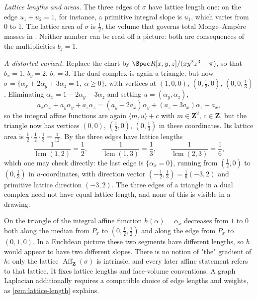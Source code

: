 \begin{example}
\emph{Lattice lengths and areas.} The three edges of $\sigma$ have
lattice length one: on the edge $u_1+u_2=1$, for instance, a primitive
integral slope is $u_1$, which varies from $0$ to $1$. The lattice
area of $\sigma$ is $\tfrac12$, the volume that governs total
Monge--Amp\`ere masses in . Neither number can
be read off a picture: both are consequences of the multiplicities
$b_j=1$.

\emph{A distorted variant.} Replace the chart by
$\Spec R[x,y,z]/(xy^2z^3-\pi)$, so that $b_x=1$, $b_y=2$,
$b_z=3$. The dual complex is again a triangle, but now
$\sigma=\{\alpha_x+2\alpha_y+3\alpha_z=1,\ \alpha\ge0\}$, with vertices at
$(1,0,0)$, $(0,\tfrac12,0)$, $(0,0,\tfrac13)$. Eliminating
$\alpha_x=1-2\alpha_y-3\alpha_z$ and setting $u=(\alpha_y,\alpha_z)$,
\[
 a_x\alpha_x+a_y\alpha_y+a_z\alpha_z
 =(a_y-2a_x)\alpha_y+(a_z-3a_x)\alpha_z+a_x,
\]
so the integral affine functions are again $\langle m,u\rangle+c$ with
$m\in\mathbf Z^2$, $c\in\mathbf Z$, but the triangle now has vertices
$(0,0)$, $(\tfrac12,0)$, $(0,\tfrac13)$ in these coordinates. Its
lattice area is $\tfrac12\cdot\tfrac12\cdot\tfrac13=\tfrac1{12}$. By
 the three edges have lattice lengths
\[
 \frac1{\operatorname{lcm}(1,2)}=\frac12,\qquad
 \frac1{\operatorname{lcm}(1,3)}=\frac13,\qquad
 \frac1{\operatorname{lcm}(2,3)}=\frac16,
\]
which one may check directly: the last edge is $\{\alpha_x=0\}$, running
from $(\tfrac12,0)$ to $(0,\tfrac13)$ in $u$-coordinates, with
direction vector $(-\tfrac12,\tfrac13)=\tfrac16(-3,2)$ and primitive
lattice direction $(-3,2)$. The three edges of a triangle in a dual
complex need not have equal lattice length, and none of this is visible in a
drawing.
\end{example}

\begin{remark}
\label{rem:barycentric-warning}
On the triangle of  the integral affine
function $h(\alpha)=\alpha_x$ decreases from $1$ to $0$ both along the
median from $P_x$ to $(0,\tfrac12,\tfrac12)$ and along the edge from
$P_x$ to $(0,1,0)$. In a Euclidean picture these two segments have
different lengths, so $h$ would appear to have two different slopes. There
is no notion of "the" gradient of $h$: only the lattice
$\operatorname{Aff}_{\mathbf Z}(\sigma)$ is intrinsic, and every later
affine statement refers to that lattice. It fixes lattice lengths and
face-volume conventions. A graph Laplacian additionally requires a
compatible choice of edge lengths and weights, as
\cref{rem:lattice-length} explains.
\end{remark}

